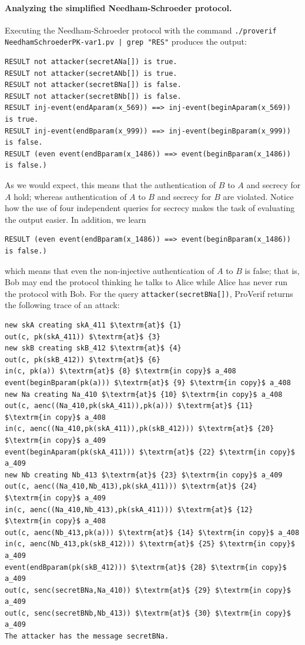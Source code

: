 \documentclass{book}
\newcommand{\A}{A}
\newcommand{\B}{B}
\begin{document}
\paragraph{Analyzing the simplified Needham-Schroeder protocol.} Executing the Needham-Schroeder protocol with the command \texttt{./proverif {\docexdir}NeedhamSchroederPK-var1.pv | grep "RES"} produces the output:
%
\small
\begin{lstlisting}[numbers=none]
RESULT not attacker(secretANa[]) is true.
RESULT not attacker(secretANb[]) is true.
RESULT not attacker(secretBNa[]) is false.
RESULT not attacker(secretBNb[]) is false.
RESULT inj-event(endAparam(x_569)) ==> inj-event(beginAparam(x_569)) is true.
RESULT inj-event(endBparam(x_999)) ==> inj-event(beginBparam(x_999)) is false.
RESULT (even event(endBparam(x_1486)) ==> event(beginBparam(x_1486)) is false.)
\end{lstlisting}
\normalsize
%
As we would expect, this means that the authentication of $\B$ to $\A$ and secrecy for $\A$ hold; whereas authentication of $\A$ to $\B$ and secrecy for $\B$ are violated. Notice how the use of four independent queries for secrecy makes the task of evaluating the output easier. In addition, we learn
\small
\begin{lstlisting}[numbers=none]
RESULT (even event(endBparam(x_1486)) ==> event(beginBparam(x_1486)) is false.)
\end{lstlisting}
\normalsize
which means that even the non-injective authentication of $\A$ to $\B$
is false; that is, Bob may end the protocol thinking he talks to Alice
while Alice has never run the protocol with Bob. For the query
\lstinline!attacker(secretBNa[])!, ProVerif returns the following
trace of an attack:
%
\begin{lstlisting}
new skA creating skA_411 $\textrm{at}$ {1}
out(c, pk(skA_411)) $\textrm{at}$ {3}
new skB creating skB_412 $\textrm{at}$ {4}
out(c, pk(skB_412)) $\textrm{at}$ {6}
in(c, pk(a)) $\textrm{at}$ {8} $\textrm{in copy}$ a_408
event(beginBparam(pk(a))) $\textrm{at}$ {9} $\textrm{in copy}$ a_408
new Na creating Na_410 $\textrm{at}$ {10} $\textrm{in copy}$ a_408
out(c, aenc((Na_410,pk(skA_411)),pk(a))) $\textrm{at}$ {11} $\textrm{in copy}$ a_408
in(c, aenc((Na_410,pk(skA_411)),pk(skB_412))) $\textrm{at}$ {20} $\textrm{in copy}$ a_409
event(beginAparam(pk(skA_411))) $\textrm{at}$ {22} $\textrm{in copy}$ a_409
new Nb creating Nb_413 $\textrm{at}$ {23} $\textrm{in copy}$ a_409
out(c, aenc((Na_410,Nb_413),pk(skA_411))) $\textrm{at}$ {24} $\textrm{in copy}$ a_409
in(c, aenc((Na_410,Nb_413),pk(skA_411))) $\textrm{at}$ {12} $\textrm{in copy}$ a_408
out(c, aenc(Nb_413,pk(a))) $\textrm{at}$ {14} $\textrm{in copy}$ a_408
in(c, aenc(Nb_413,pk(skB_412))) $\textrm{at}$ {25} $\textrm{in copy}$ a_409
event(endBparam(pk(skB_412))) $\textrm{at}$ {28} $\textrm{in copy}$ a_409
out(c, senc(secretBNa,Na_410)) $\textrm{at}$ {29} $\textrm{in copy}$ a_409
out(c, senc(secretBNb,Nb_413)) $\textrm{at}$ {30} $\textrm{in copy}$ a_409
The attacker has the message secretBNa.
\end{lstlisting}
\end{document}
